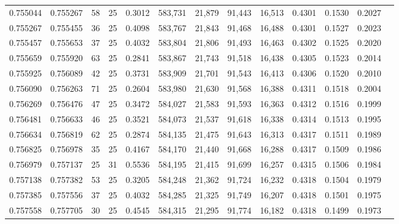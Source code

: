 \begin{tabular}{rrrrrrrrrrrrr}
0.755044 & 0.755267 &    58 &  25 &                                     0.3012 & 583,731 &  21,879 &  91,443 &  16,513 & 0.4301 & 0.1530 & 0.2027 \\
0.755267 & 0.755455 &    36 &  25 &                                     0.4098 & 583,767 &  21,843 &  91,468 &  16,488 & 0.4301 & 0.1527 & 0.2023 \\
0.755457 & 0.755653 &    37 &  25 &                                     0.4032 & 583,804 &  21,806 &  91,493 &  16,463 & 0.4302 & 0.1525 & 0.2020 \\
0.755659 & 0.755920 &    63 &  25 &                                     0.2841 & 583,867 &  21,743 &  91,518 &  16,438 & 0.4305 & 0.1523 & 0.2014 \\
0.755925 & 0.756089 &    42 &  25 &                                     0.3731 & 583,909 &  21,701 &  91,543 &  16,413 & 0.4306 & 0.1520 & 0.2010 \\
0.756090 & 0.756263 &    71 &  25 &                                     0.2604 & 583,980 &  21,630 &  91,568 &  16,388 & 0.4311 & 0.1518 & 0.2004 \\
0.756269 & 0.756476 &    47 &  25 &                                     0.3472 & 584,027 &  21,583 &  91,593 &  16,363 & 0.4312 & 0.1516 & 0.1999 \\
0.756481 & 0.756633 &    46 &  25 &                                     0.3521 & 584,073 &  21,537 &  91,618 &  16,338 & 0.4314 & 0.1513 & 0.1995 \\
0.756634 & 0.756819 &    62 &  25 &                                     0.2874 & 584,135 &  21,475 &  91,643 &  16,313 & 0.4317 & 0.1511 & 0.1989 \\
0.756825 & 0.756978 &    35 &  25 &                                     0.4167 & 584,170 &  21,440 &  91,668 &  16,288 & 0.4317 & 0.1509 & 0.1986 \\
0.756979 & 0.757137 &    25 &  31 &                                     0.5536 & 584,195 &  21,415 &  91,699 &  16,257 & 0.4315 & 0.1506 & 0.1984 \\
0.757138 & 0.757382 &    53 &  25 &                                     0.3205 & 584,248 &  21,362 &  91,724 &  16,232 & 0.4318 & 0.1504 & 0.1979 \\
0.757385 & 0.757556 &    37 &  25 &                                     0.4032 & 584,285 &  21,325 &  91,749 &  16,207 & 0.4318 & 0.1501 & 0.1975 \\
0.757558 & 0.757705 &    30 &  25 &                                     0.4545 & 584,315 &  21,295 &  91,774 &  16,182 & 0.4318 & 0.1499 & 0.1973 \\

\end{tabular}
